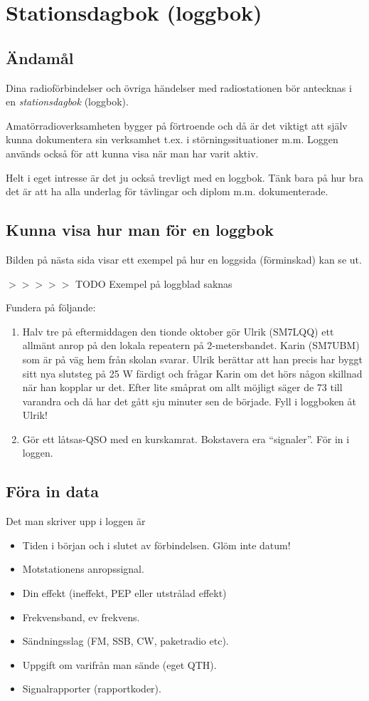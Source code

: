 \section{Stationsdagbok (loggbok)}

\subsection{Ändamål}

Dina radioförbindelser och övriga händelser med radiostationen bör
antecknas i en \emph{stationsdagbok} (loggbok).

Amatörradioverksamheten bygger på förtroende och då är det viktigt att
själv kunna dokumentera sin verksamhet t.ex. i störningssituationer
m.m. Loggen används också för att kunna visa när man har varit aktiv.

Helt i eget intresse är det ju också trevligt med en loggbok. Tänk
bara på hur bra det är att ha alla underlag för tävlingar och diplom
m.m. dokumenterade.

\subsection{Kunna visa hur man för en loggbok}

Bilden på nästa sida visar ett exempel på hur en loggsida (förminskad)
kan se ut.

$>>>>>$ TODO Exempel på loggblad saknas

Fundera på följande:
\begin{enumerate}
\item Halv tre på eftermiddagen den tionde oktober gör Ulrik (SM7LQQ)
  ett allmänt anrop på den lokala repeatern på 2-metersbandet.  Karin
  (SM7UBM) som är på väg hem från skolan svarar. Ulrik berättar att
  han precis har byggt sitt nya slutsteg på 25 W färdigt och frågar
  Karin om det hörs någon skillnad när han kopplar ur det. Efter lite
  småprat om allt möjligt säger de 73 till varandra och då har det
  gått sju minuter sen de började.  Fyll i loggboken åt Ulrik!
\item Gör ett låtsas-QSO med en kurskamrat. Bokstavera era
  ``signaler''. För in i loggen.
\end{enumerate}

\subsection{Föra in data}
Det man skriver upp i loggen är
\begin{itemize}
\item Tiden i början och i slutet av förbindelsen. Glöm inte datum!
\item Motstationens anropssignal.
\item Din effekt (ineffekt, PEP eller utstrålad effekt)
\item Frekvensband, ev frekvens.
\item Sändningsslag (FM, SSB, CW, paketradio etc).
\item Uppgift om varifrån man sände (eget QTH).
\item Signalrapporter (rapportkoder).
\end{itemize}

